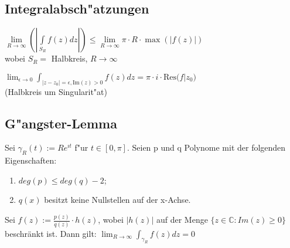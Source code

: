 \subsection{Integralabsch"atzungen}
\( \lim\limits_{R \to \infty} \left( \left\vert \int\limits_{S_R} f(z) dz \right\vert \right) \leqslant
\lim\limits_{R \to \infty} \pi \cdot R \cdot \max \left( \left\vert f(z) \right\vert \right) \)\\
wobei \(S_R =\) Halbkreis, \(R \to \infty\)

\( \displaystyle \lim_{\epsilon \to 0} \int_{\vert z-z_0 \vert = \epsilon, \text{Im}(z) > 0} f(z) dz
= \pi \cdot i \cdot \text{Res}\big(f \big\vert z_0\big) \)\\
(Halbkreis um Singularit"at)


\subsection{G"angster-Lemma}

Sei $\gamma_R (t) := Re^{ıt}$ f"ur $t \in [0, \pi].$ Seien p und q Polynome mit der
folgenden Eigenschaften:
\begin{enumerate}
	\item $deg(p) ≤ deg(q) − 2$;
	\item $q(x)$ besitzt keine Nullstellen auf der x-Achse.
\end{enumerate}
Sei $f(z) := \frac{p(z)}{q(z)} \cdot h(z)$, wobei $\vert h(z) \vert$ auf der Menge $\{  z \in \mathbb{C} : Im(z) \geq 0\}$ beschränkt ist. Dann gilt: $\lim_{R \rightarrow \infty} \int_{\gamma_R} f(z) dz = 0$




